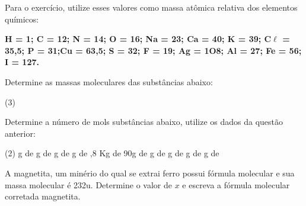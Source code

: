 \documentclass[11pt]{article}
\begin{document}
\begin{exercise}
Para o exercício, utilize esses valores como massa atômica relativa dos elementos químicos:

\textbf{H = 1; C = 12; N = 14; O = 16; Na = 23; Ca = 40; K = 39; C\(\ell\) = 35,5; P = 31;Cu = 63,5; S = 32; F = 19; Ag = 1O8; Al = 27; Fe = 56; I = 127.}


Determine as massas moleculares das substâncias abaixo:
\begin{choice}(3)
\choice {}
\choice {}
\choice {}
\vspace{3cm}
\choice {}
\choice  {}
\choice {}
\vspace{3cm}
\choice {}
\choice {}
\choice {}
\vspace{3.0cm}
\choice {}
\choice {}
\vspace{3.5cm}
\end{choice}
\end{exercise}




\begin{exercise}
Determine a número de mols substâncias abaixo, utilize os dados da questão anterior:
\begin{choice}(2)
 g de 
 g de 
\vspace{3.5cm}
 g de 
 g de 
\vspace{3.5cm}
,8 Kg de 
\choice 90g de 
\vspace{3.0cm}
 g de 
\vspace{3.5cm}
 g de 
 g de 
\vspace{3.5cm}
 g de 
\choice {}
\end{choice}
\end{exercise}


\begin{exercise}
A magnetita, um minério do qual se extrai ferro possui fórmula molecular   e sua massa molecular é 232u. Determine o valor de \(x\) e escreva a fórmula molecular corretada magnetita.
\end{exercise}




\end{document}
